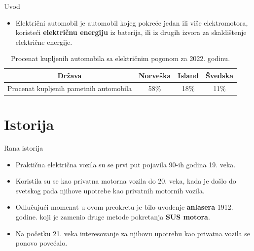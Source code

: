\documentclass[11pt]{beamer}
\begin{document}
\begin{frame}{Uvod}
\begin{itemize}
    \item  Električni automobil  je automobil kojeg pokreće jedan ili više elektromotora, koristeći \textbf{električnu energiju} iz baterija, ili iz drugih izvora za skaldištenje električne energije.
\end{itemize}
\begin{table}[htb]
        \caption{Procenat kupljenih automobila sa električnim pogonom za 2022. godinu.}
        \label{tab:modelo_tabela}
        \centering
       \begin{tabular}{|c|c|c|c|} \hline
Država& Norveška& Island& Švedska\\ \hline
Procenat kupljenih pametnih automobila& 58\%& 18\%& 11\%\\ \hline
\end{tabular}
        
       
    \end{table}

\end{frame}

\section{Istorija}
\begin{frame}{Rana istorija}
\begin{itemize}
    \item Praktična električna vozila su se prvi put pojavila 90-ih godina 19. veka.
    \item Koristila su se kao privatna motorna vozila do 20. veka, kada je došlo do svetskog pada njihove upotrebe kao privatnih motornih vozila.
    \item Odlučujući momenat u ovom preokretu je bilo uvođenje \textbf{anlasera} 1912. godine. koji je zamenio druge metode pokretanja \textbf{SUS motora}.
    \item Na početku 21. veka interesovanje za njihovu upotrebu kao privatna vozila se ponovo povećalo.
\end{itemize}
\end{frame}
\end{document}
